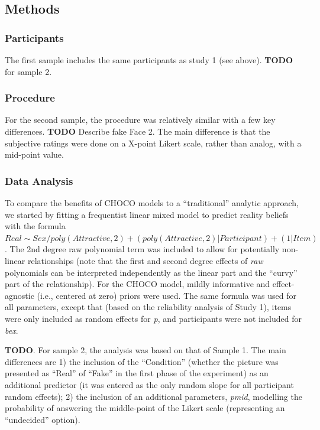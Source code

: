 \documentclass[
  jou,
  floatsintext,
  longtable,
  nolmodern,
  notxfonts,
  notimes,
  colorlinks=true,linkcolor=blue,citecolor=blue,urlcolor=blue]{apa7}
\begin{document}
\subsection{Methods}\label{methods-1}

\subsubsection{Participants}\label{participants-1}

The first sample includes the same participants as study 1 (see above).
\textbf{TODO} for sample 2.

\subsubsection{Procedure}\label{procedure-1}

For the second sample, the procedure was relatively similar with a few
key differences. \textbf{TODO} Describe fake Face 2. The main difference
is that the subjective ratings were done on a X-point Likert scale,
rather than analog, with a mid-point value.

\subsubsection{Data Analysis}\label{data-analysis-1}

To compare the benefits of CHOCO models to a ``traditional'' analytic
approach, we started by fitting a frequentist linear mixed model to
predict reality beliefs with the formula
\(Real\sim Sex / poly(Attractive, 2) + (poly(Attractive, 2)|Participant) + (1|Item)\).
The 2nd degree raw polynomial term was included to allow for potentially
non-linear relationships (note that the first and second degree effects
of \emph{raw} polynomials can be interpreted independently as the linear
part and the ``curvy'' part of the relationship). For the CHOCO model,
mildly informative and effect-agnostic (i.e., centered at zero) priors
were used. The same formula was used for all parameters, except that
(based on the reliability analysis of Study 1), items were only included
as random effects for \emph{p}, and participants were not included for
\emph{bex}.

\textbf{TODO}. For sample 2, the analysis was based on that of Sample 1.
The main differences are 1) the inclusion of the ``Condition'' (whether
the picture was presented as ``Real'' of ``Fake'' in the first phase of
the experiment) as an additional predictor (it was entered as the only
random slope for all participant random effects); 2) the inclusion of an
additional parameters, \emph{pmid}, modelling the probability of
answering the middle-point of the Likert scale (representing an
``undecided'' option).
\end{document}
